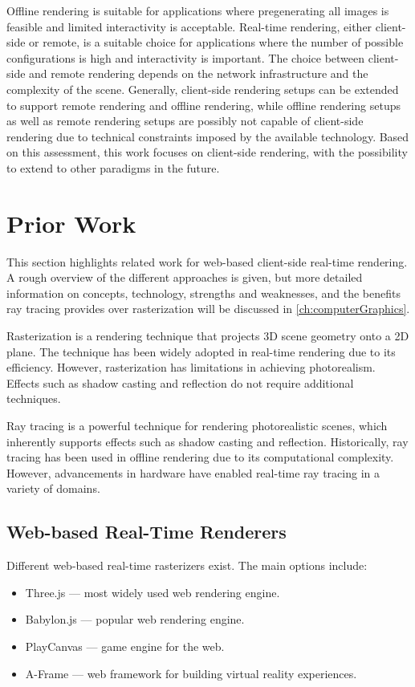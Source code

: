 Offline rendering is suitable for applications where pregenerating all images is feasible and limited interactivity is acceptable. Real-time rendering, either client-side or remote, is a suitable choice for applications where the number of possible configurations is high and interactivity is important. The choice between client-side and remote rendering depends on the network infrastructure and the complexity of the scene.
Generally, client-side rendering setups can be extended to support remote rendering and offline rendering, while offline rendering setups as well as remote rendering setups are possibly not capable of client-side rendering due to technical constraints imposed by the available technology. Based on this assessment, this work focuses on client-side rendering, with the possibility to extend to other paradigms in the future.

\section{Prior Work}

This section highlights related work for web-based client-side real-time rendering. A rough overview of the different approaches is given, but more detailed information on concepts, technology, strengths and weaknesses, and the benefits ray tracing provides over rasterization will be discussed in \autoref{ch:computerGraphics}.

Rasterization is a rendering technique that projects 3D scene geometry onto a 2D plane. The technique has been widely adopted in real-time rendering due to its efficiency. However, rasterization has limitations in achieving photorealism. Effects such as shadow casting and reflection do not require additional techniques.

Ray tracing is a powerful technique for rendering photorealistic scenes, which inherently supports effects such as shadow casting and reflection. Historically, ray tracing has been used in offline rendering due to its computational complexity. However, advancements in hardware have enabled real-time ray tracing in a variety of domains.

\subsection*{Web-based Real-Time Renderers}

Different web-based real-time rasterizers exist. The main options include:

\begin{itemize}
  \item {\gls{Three.js}} \cite{threeJSWebsite} — most widely used web rendering engine.
  \item {\gls{Babylon.js}} \cite{babylonJSWebsite} — popular web rendering engine.
  \item {\gls{PlayCanvas}} \cite{playCanvasWebsite} — game engine for the web.
  \item {\gls{A-Frame}} \cite{aFrameWebsite} — web framework for building virtual reality experiences.
\end{itemize}

